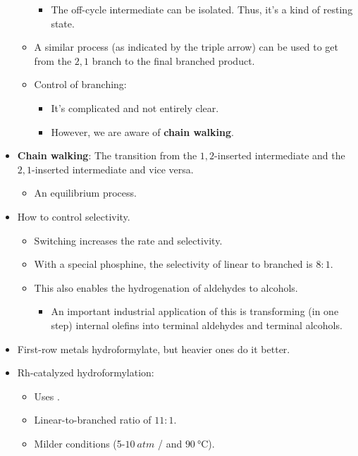 \documentclass[../notes.tex]{subfiles}
\begin{document}
\begin{itemize}
\begin{itemize}
        \begin{itemize}
            \item The off-cycle intermediate can be isolated. Thus, it's a kind of resting state.
        \end{itemize}
        \item A similar process (as indicated by the triple arrow) can be used to get from the $2,1$ branch to the final branched product.
        \item Control of branching:
        \begin{itemize}
            \item It's complicated and not entirely clear.
            \item However, we are aware of \textbf{chain walking}.
        \end{itemize}
    \end{itemize}
    \item \textbf{Chain walking}: The transition from the $1,2$-inserted intermediate and the $2,1$-inserted intermediate and vice versa.
    \begin{itemize}
        \item An equilibrium process.
    \end{itemize}
    \item How to control selectivity.
    \begin{itemize}
        \item Switching  increases the rate and selectivity.
        \item With a special phosphine, the selectivity of linear to branched is $8:1$.
        \item This also enables the hydrogenation of aldehydes to alcohols.
        \begin{itemize}
            \item An important industrial application of this is transforming (in one step) internal olefins into terminal aldehydes and terminal alcohols.
        \end{itemize}
    \end{itemize}
    \item First-row metals hydroformylate, but heavier ones do it better.
    \item Rh-catalyzed hydroformylation:
    \begin{itemize}
        \item Uses .
        \item Linear-to-branched ratio of $11:1$.
        \item Milder conditions (5-$\SI{10}{atm}$  /  and $\SI{90}{\celsius}$).

\end{itemize}
\end{itemize}
\end{document}
